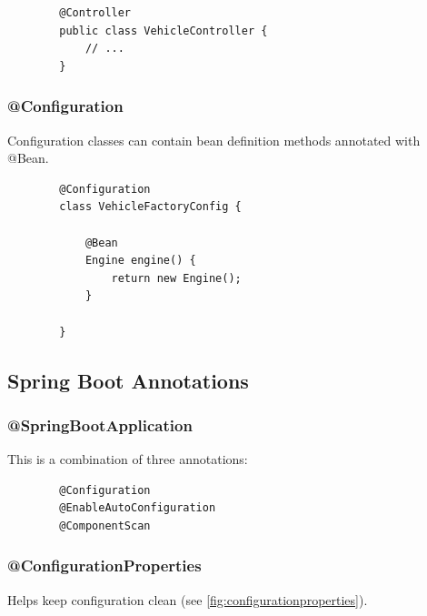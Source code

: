 \documentclass{scrartcl}
\begin{document}
    \begin{lstlisting}
        @Controller
        public class VehicleController {
            // ...
        }
    \end{lstlisting}

\subsubsection{@Configuration}

    Configuration classes can contain bean definition methods annotated with @Bean.

    \begin{lstlisting}
        @Configuration
        class VehicleFactoryConfig {

            @Bean
            Engine engine() {
                return new Engine();
            }

        }
    \end{lstlisting}


\subsection{Spring Boot Annotations}
\subsubsection{@SpringBootApplication}

    This is a combination of three annotations:

    \begin{lstlisting}
        @Configuration
        @EnableAutoConfiguration
        @ComponentScan
    \end{lstlisting}

\subsubsection{@ConfigurationProperties}

    Helps keep configuration clean (see \ref{fig:configurationproperties}).
\end{document}
